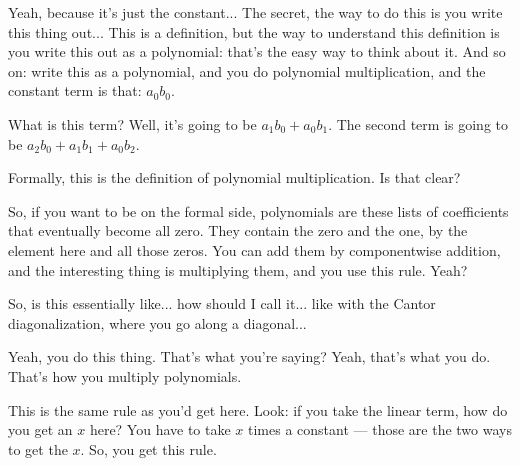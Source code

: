 \begin{speech}[01:27:44 - 01:28:55]
Yeah, because it's just the constant... The secret, the way to do this is you write this thing out... This is a definition, but the way to understand this definition is you write this out as a polynomial:  that's the easy way to think about it. And so on: write this as a polynomial,  and you do polynomial multiplication, and the constant term is that: $a_0 b_0$. 

What is this term? Well, it's going to be $a_1 b_0 + a_0 b_1$.  The second term is going to be $a_2 b_0 + a_1 b_1 + a_0 b_2$. 

Formally, this is the definition of polynomial multiplication. Is that clear?

So, if you want to be on the formal side, polynomials are these lists of coefficients that eventually become all zero. They contain the zero and the one, by the element here and all those zeros. You can add them by componentwise addition, and the interesting thing is multiplying them, and you use this rule. Yeah?
\end{speech}

\begin{student}
So, is this essentially like... how should I call it... like with the Cantor diagonalization, where you go along a diagonal...
\end{student}

\begin{speech}[01:29:05 - 01:29:40]
Yeah, you do this thing.  That's what you're saying? Yeah, that's what you do. That's how you multiply polynomials.

This is the same rule as you'd get here. Look: if you take the linear term, how do you get an $x$ here? You have to take $x$ times a constant --- those are the two ways to get the $x$. So, you get this rule.
\end{speech}

